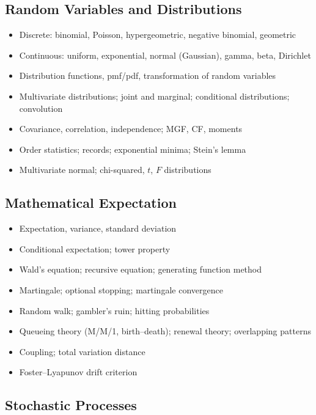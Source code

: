 \subsection{Random Variables and Distributions}

\begin{itemize}
  \item Discrete: binomial, Poisson, hypergeometric, negative binomial, geometric
  \item Continuous: uniform, exponential, normal (Gaussian), gamma, beta, Dirichlet
  \item Distribution functions, pmf/pdf, transformation of random variables
  \item Multivariate distributions; joint and marginal; conditional distributions; convolution
  \item Covariance, correlation, independence; MGF, CF, moments
  \item Order statistics; records; exponential minima; Stein's lemma
  \item Multivariate normal; chi-squared, $t$, $F$ distributions
\end{itemize}

\subsection{Mathematical Expectation}

\begin{itemize}
  \item Expectation, variance, standard deviation
  \item Conditional expectation; tower property
  \item Wald's equation; recursive equation; generating function method
  \item Martingale; optional stopping; martingale convergence
  \item Random walk; gambler's ruin; hitting probabilities
  \item Queueing theory (M/M/1, birth--death); renewal theory; overlapping patterns
  \item Coupling; total variation distance
  \item Foster--Lyapunov drift criterion
\end{itemize}

\subsection{Stochastic Processes}

